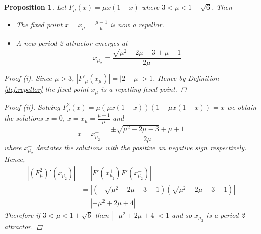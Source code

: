 \documentclass[11pt,a4paper,oneside]{memoir}
\theoremstyle{plain}
\newtheorem{prop}[thm]{Proposition}
\theoremstyle{definition}
\begin{document}
\begin{prop} \label{prop:logistic3}
    Let $F_\mu(x) = \mu x (1-x)$ where $3 < \mu < 1 + \sqrt{6}$. Then
    \begin{itemize}
        \item[(i)] The fixed point $x = x_\mu = \frac{\mu - 1}{\mu}$ is now a repellor.
        \item[(ii)] A new period-2 attractor emerges at \[x_{\mu_2} = \frac{\sqrt{\mu^2 - 2\mu - 3} + \mu + 1}{2\mu}\]
    \end{itemize}
    \begin{proof}[Proof (i)]
        Since $\mu > 3$, $|F'_\mu(x_\mu)| = |2-\mu| > 1$. Hence by Definition \ref{def:repellor} the fixed point $x_\mu$ is a repelling fixed point.
    \end{proof}
    \begin{proof}[Proof (ii)]
        Solving $F^2_\mu(x) = \mu(\mu x(1-x))(1-\mu x(1-x)) = x$ we obtain the solutions $x = 0$, $x = x_\mu = \frac{\mu - 1}{\mu}$ and \[x = x^\pm_{\mu_2} = \frac{\pm\sqrt{\mu^2 - 2\mu - 3} + \mu + 1}{2\mu}\] where $x^\pm_{\mu_2}$ dentotes the solutions with the positive an negative sign respectively. Hence,
        \begin{align*}
        \left\lvert (F_\mu^2)'(x_{\mu_2})\right\rvert &= \left\lvert F'(x^+_{\mu_2}) F'(x^-_{\mu_2}) \right\rvert \\ &= \left\lvert \left( - \sqrt{\mu^2 - 2\mu - 3} - 1 \right) \left( \sqrt{\mu^2 - 2\mu - 3} - 1\right) \right\rvert \\ &= \left\lvert -\mu^2 + 2\mu + 4 \right\rvert
        \end{align*}
        Therefore if $3 < \mu < 1 + \sqrt{6}$ then $\left\lvert -\mu^2 + 2\mu + 4 \right\rvert < 1$ and so $x_{\mu_2}$ is a period-2 attractor.
    \end{proof}
\end{prop}
\end{document}
